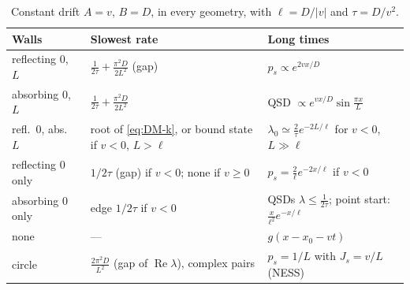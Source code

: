 \documentclass[11pt]{article}
\numberwithin{equation}{section}
\begin{document}
\begin{table}[h]
\centering
\small
\renewcommand{\arraystretch}{1.35}
\begin{tabular}{@{}l l l@{}}
\toprule
Walls & Slowest rate & Long times \\
\midrule
reflecting $0$, $L$   & $\frac1{2\tau}+\frac{\pi^2D}{2L^2}$ (gap) & $p_s\propto e^{2vx/D}$ \\
absorbing $0$, $L$    & $\frac1{2\tau}+\frac{\pi^2D}{2L^2}$       & QSD $\propto e^{vx/D}\sin\frac{\pi x}{L}$ \\
refl.\ $0$, abs.\ $L$ & root of \cref{eq:DM-k}, or bound state if $v<0$, $L>\ell$ & $\lambda_0\simeq\frac2\tau e^{-2L/\ell}$ for $v<0$, $L\gg\ell$ \\
reflecting $0$ only   & $1/2\tau$ (gap) if $v<0$; none if $v\ge0$  & $p_s=\frac2\ell e^{-2x/\ell}$ if $v<0$ \\
absorbing $0$ only    & edge $1/2\tau$ if $v<0$                     & QSDs $\lambda\le\frac1{2\tau}$; point start: $\frac{x}{\ell^2}e^{-x/\ell}$ \\
none                  & ---                                         & $g(x-x_0-vt)$ \\
circle                & $\frac{2\pi^2D}{L^2}$ (gap of $\operatorname{Re}\lambda$), complex pairs & $p_s=1/L$ with $J_s=v/L$ (NESS) \\
\bottomrule
\end{tabular}
\caption{Constant drift $A=v$, $B=D$, in every geometry, with $\ell=D/|v|$ and $\tau=D/v^2$.}
\label{tab:drift-summary}
\end{table}
\end{document}
